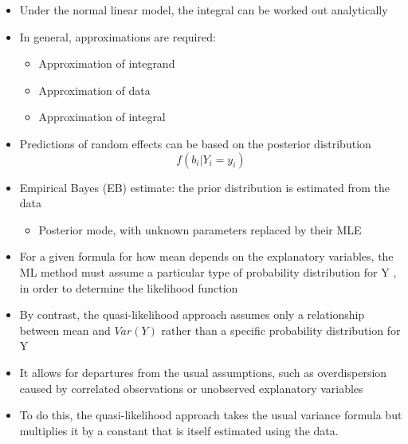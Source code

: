 \documentclass{beamer}
\begin{document}
\begin{frame}
\begin{itemize}
\item Under the normal linear model, the integral can be worked out analytically
\item In general, approximations are required:
\begin{itemize}
	\item Approximation of integrand
	\item Approximation of data
	\item Approximation of integral
\end{itemize}
\item Predictions of random effects can be based on the posterior distribution
\[f(b_i|Y_i=y_i) \]
\item Empirical Bayes (EB) estimate:  the prior distribution is estimated from the data
\begin{itemize}
	\item Posterior mode, with unknown parameters replaced by their MLE
\end{itemize}
\end{itemize}		
\end{frame}


\begin{frame}
\begin{itemize}
\item For a given formula for how mean depends on the explanatory variables, the ML method must assume a particular type of probability distribution for Y , in order to determine the likelihood function \vspace{0.25cm}
\item By contrast, the quasi-likelihood approach assumes only a relationship between mean and $Var(Y)$ rather than a specific probability distribution for Y \vspace{0.25cm}
\item It allows for departures from the usual assumptions, such as overdispersion caused by correlated observations or unobserved explanatory variables \vspace{0.25cm}
\item To do this, the quasi-likelihood approach takes the usual variance formula but multiplies it by a constant that is itself estimated using the data.
\end{itemize}
\end{frame}
\end{document}
